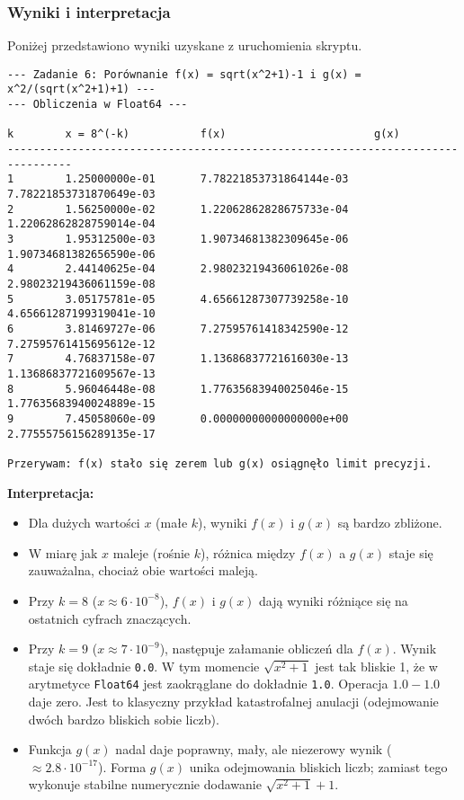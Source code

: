 \documentclass[11pt, a4paper]{article}
\begin{document}
\subsubsection{Wyniki i interpretacja}
Poniżej przedstawiono wyniki uzyskane z uruchomienia skryptu.
\begin{verbatim}
--- Zadanie 6: Porównanie f(x) = sqrt(x^2+1)-1 i g(x) = x^2/(sqrt(x^2+1)+1) ---
--- Obliczenia w Float64 ---

k        x = 8^(-k)           f(x)                       g(x)
--------------------------------------------------------------------------------
1        1.25000000e-01       7.78221853731864144e-03       7.78221853731870649e-03
2        1.56250000e-02       1.22062862828675733e-04       1.22062862828759014e-04
3        1.95312500e-03       1.90734681382309645e-06       1.90734681382656590e-06
4        2.44140625e-04       2.98023219436061026e-08       2.98023219436061159e-08
5        3.05175781e-05       4.65661287307739258e-10       4.65661287199319041e-10
6        3.81469727e-06       7.27595761418342590e-12       7.27595761415695612e-12
7        4.76837158e-07       1.13686837721616030e-13       1.13686837721609567e-13
8        5.96046448e-08       1.77635683940025046e-15       1.77635683940024889e-15
9        7.45058060e-09       0.00000000000000000e+00       2.77555756156289135e-17

Przerywam: f(x) stało się zerem lub g(x) osiągnęło limit precyzji.

\end{verbatim}

\noindent \textbf{Interpretacja:}
\begin{itemize}
    \item Dla dużych wartości $x$ (małe $k$), wyniki $f(x)$ i $g(x)$ są bardzo zbliżone.
    \item W miarę jak $x$ maleje (rośnie $k$), różnica między $f(x)$ a $g(x)$ staje się zauważalna, chociaż obie wartości maleją.
    \item Przy $k=8$ ($x \approx 6 \cdot 10^{-8}$), $f(x)$ i $g(x)$ dają wyniki różniące się na ostatnich cyfrach znaczących.
    \item Przy $k=9$ ($x \approx 7 \cdot 10^{-9}$), następuje załamanie obliczeń dla $f(x)$. Wynik staje się dokładnie \texttt{0.0}. W tym momencie $\sqrt{x^2+1}$ jest tak bliskie 1, że w arytmetyce \texttt{Float64} jest zaokrąglane do dokładnie \texttt{1.0}. Operacja $1.0 - 1.0$ daje zero. Jest to klasyczny przykład  katastrofalnej anulacji  (odejmowanie dwóch bardzo bliskich sobie liczb).
    
    \item Funkcja $g(x)$ nadal daje poprawny, mały, ale niezerowy wynik ($ \approx 2.8 \cdot 10^{-17}$). Forma $g(x)$ unika odejmowania bliskich liczb; zamiast tego wykonuje stabilne numerycznie dodawanie $\sqrt{x^2+1} + 1$.
\end{itemize}
\end{document}
